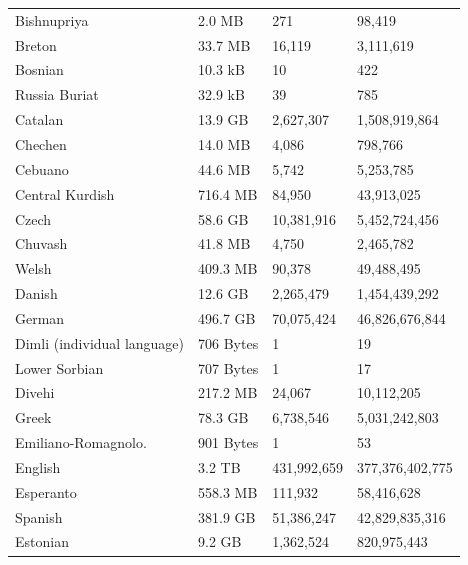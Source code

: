 \begin{table}[t!]
\begin{tabular}{llll}
        Bishnupriya                 & 2.0 MB    & 271         & 98,419          \\
        Breton                      & 33.7 MB   & 16,119      & 3,111,619       \\
        Bosnian                     & 10.3 kB   & 10          & 422             \\
        Russia Buriat               & 32.9 kB   & 39          & 785             \\
        Catalan                     & 13.9 GB   & 2,627,307   & 1,508,919,864   \\
        Chechen                     & 14.0 MB   & 4,086       & 798,766         \\
        Cebuano                     & 44.6 MB   & 5,742       & 5,253,785       \\
        Central Kurdish             & 716.4 MB  & 84,950      & 43,913,025      \\
        Czech                       & 58.6 GB   & 10,381,916  & 5,452,724,456   \\
        Chuvash                     & 41.8 MB   & 4,750       & 2,465,782       \\
        Welsh                       & 409.3 MB  & 90,378      & 49,488,495      \\
        Danish                      & 12.6 GB   & 2,265,479   & 1,454,439,292   \\
        German                      & 496.7 GB  & 70,075,424  & 46,826,676,844  \\
        Dimli (individual language) & 706 Bytes & 1           & 19              \\
        Lower Sorbian               & 707 Bytes & 1           & 17              \\
        Divehi                      & 217.2 MB  & 24,067      & 10,112,205      \\
        Greek                       & 78.3 GB   & 6,738,546   & 5,031,242,803   \\
        Emiliano-Romagnolo.         & 901 Bytes & 1           & 53              \\
        English                     & 3.2 TB    & 431,992,659 & 377,376,402,775 \\
        Esperanto                   & 558.3 MB  & 111,932     & 58,416,628      \\
        Spanish                     & 381.9 GB  & 51,386,247  & 42,829,835,316  \\
        Estonian                    & 9.2 GB    & 1,362,524   & 820,975,443     \\

\end{tabular}
\end{table}
